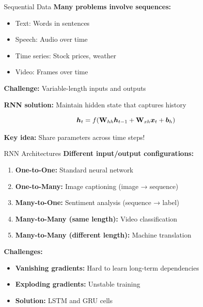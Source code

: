 \documentclass[aspectratio=169]{beamer}
\begin{document}
\begin{frame}{Sequential Data}
  \textbf{Many problems involve sequences:}
  \begin{itemize}
    \item Text: Words in sentences
    \item Speech: Audio over time
    \item Time series: Stock prices, weather
    \item Video: Frames over time
  \end{itemize}

  \vspace{0.5em}

  \textbf{Challenge:} Variable-length inputs and outputs

  \vspace{0.5em}

  \textbf{RNN solution:} Maintain hidden state that captures history

  \begin{equation}
    \boldsymbol{h}_t = f(\mathbf{W}_{hh} \boldsymbol{h}_{t-1} + \mathbf{W}_{xh} \boldsymbol{x}_t + \boldsymbol{b}_h)
  \end{equation}

  \textbf{Key idea:} Share parameters across time steps!
\end{frame}

\begin{frame}{RNN Architectures}
  \textbf{Different input/output configurations:}

  \vspace{0.5em}

  \begin{enumerate}
    \item \textbf{One-to-One:} Standard neural network
    \item \textbf{One-to-Many:} Image captioning (image → sequence)
    \item \textbf{Many-to-One:} Sentiment analysis (sequence → label)
    \item \textbf{Many-to-Many (same length):} Video classification
    \item \textbf{Many-to-Many (different length):} Machine translation
  \end{enumerate}

  \vspace{0.5em}

  \textbf{Challenges:}
  \begin{itemize}
    \item \textbf{Vanishing gradients:} Hard to learn long-term dependencies
    \item \textbf{Exploding gradients:} Unstable training
    \item \textbf{Solution:} LSTM and GRU cells
  \end{itemize}
\end{frame}
\end{document}
